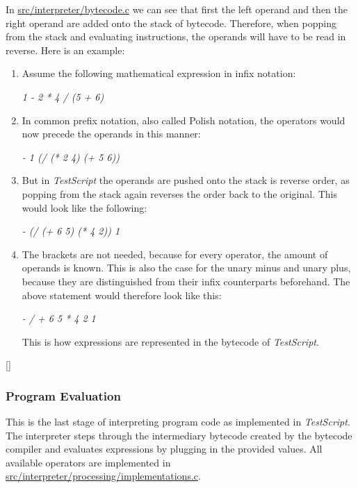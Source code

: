 \documentclass[12pt,a4paper]{article}
\newcommand{\hrc}[1]{\hyperref[#1]{#1}}
\newcommand{\expr}[1] {
    \begin{center}
        #1
    \end{center}
}
\newcommand{\name}{\emph{TestScript}}
\begin{document}
In \hrc{src/interpreter/bytecode.c} we can see that first the left operand and then
the right operand are added onto the stack of bytecode. Therefore, when
popping from the stack and evaluating instructions, the operands will have to
be read in reverse.
Here is an example:
\begin{enumerate}
    \item Assume the following mathematical expression in infix notation:
        \expr{\emph{1 - 2 * 4 / (5 + 6)}}
    \item In common prefix notation, also called Polish notation, the
        operators would now precede the operands in this manner:
        \expr{\emph{- 1 (/ (* 2 4) (+ 5 6))}}
    \item But in \name{} the operands are pushed onto the stack is reverse order,
        as popping from the stack again reverses the order back to the original.
        This would look like the following:
        \expr{\emph{- (/ (+ 6 5) (* 4 2)) 1}}
    \item The brackets are not needed, because for every operator, the amount
        of operands is known. This is also the case for the unary minus and unary plus,
        because they are distinguished from their infix counterparts beforehand.
        The above statement would therefore look like this:
        \expr{\emph{- / + 6 5 * 4 2 1}}
        This is how expressions are represented in the bytecode of \name{}.
\end{enumerate}
[]

\subsubsection{Program Evaluation}
This is the last stage of interpreting program code as implemented in \name{}.
The interpreter steps through the intermediary bytecode created by the bytecode
compiler and evaluates expressions by plugging in the provided values.
All available operators are implemented in 
\hrc{src/interpreter/processing/implementations.c}.
\end{document}
